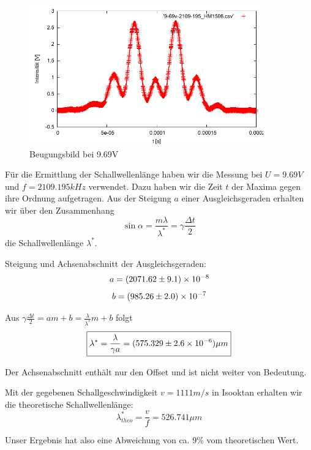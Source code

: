 \begin{figure}[H]
 \includegraphics[width=0.9\textwidth]{Bilder/9-69v.pdf}
 \caption{Beugungsbild bei 9.69V}
\end{figure}

Für die Ermittlung der Schallwellenlänge haben wir die Messung bei $ U = 9.69 V$ und $f = 2109.195 kHz $ verwendet. Dazu haben wir die Zeit $t$ der Maxima gegen ihre Ordnung aufgetragen. Aus der Steigung $a$ einer Ausgleichsgeraden erhalten wir über den Zusammenhang 
$$ \sin \alpha = \frac{m \lambda}{\lambda^{*}} = \gamma \frac{\Delta t}{2} $$
 die Schallwellenlänge $ \lambda^* $.


Steigung und Achsenabschnitt der Ausgleichsgeraden:
$$ a = (2071.62 \pm 9.1) \times 10^{-8} $$
$$ b = (985.26 \pm 2.0) \times 10^{-7} $$


Aus $ \gamma \frac{\Delta t}{2} = a m + b = \frac{\lambda}{\lambda^*} m + b $ folgt 
$$\boxed{ \lambda^* = \frac{\lambda}{\gamma a} = (575.329 \pm 2.6\times 10^{-6}) \mu m}$$

Der Achsenabschnitt enthält nur den Offset und ist nicht weiter von Bedeutung.

Mit der gegebenen Schallgeschwindigkeit $v=1111 m/s$ in Isooktan erhalten wir die theoretische Schallwellenlänge:
$$ \lambda^*_{theo} = \frac{v}{f} = 526.741 \mu m$$

Unser Ergebnis hat also eine Abweichung von ca. 9\% vom theoretischen Wert.